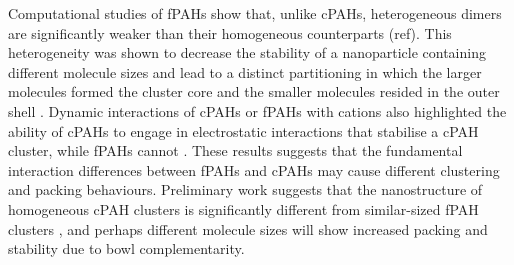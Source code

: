 Computational studies of fPAHs show that, unlike cPAHs, heterogeneous dimers are significantly weaker than their homogeneous counterparts (ref). This heterogeneity was shown to decrease the stability of a nanoparticle containing different molecule sizes and lead to a distinct partitioning in which the larger molecules formed the cluster core and the smaller molecules resided in the outer shell \cite{bowal2018partitioning}. Dynamic interactions of cPAHs or fPAHs with cations also highlighted the ability of cPAHs to engage in electrostatic interactions that stabilise a cPAH cluster, while fPAHs cannot \cite{bowal2019ion}. These results suggests that the fundamental interaction differences between fPAHs and cPAHs may cause different clustering and packing behaviours. Preliminary work suggests that the nanostructure of homogeneous cPAH clusters is significantly different from similar-sized fPAH clusters \cite{bowal2019ion}, and perhaps different molecule sizes will show increased packing and stability due to bowl complementarity.



